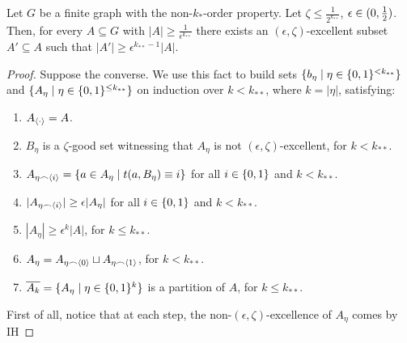         \begin{lemma}[Claim 5.4] \label{lem:existance_of_excellent_subsets}
            Let $G$ be a finite graph with the non-$k_{*}$-order property.
            Let $\zeta \leq \frac{1}{2^{k_{**}}}$, $\epsilon \in ( 0, \frac{1}{2} )$.
            Then, for every $A \subseteq G$ with $|A| \geq \frac{1}{\epsilon^{k_{**}}}$ there exists an $(\epsilon, \zeta)$-excellent
            subset $A' \subseteq A$ such that $|A'| \geq \epsilon^{k_{**}-1} |A|$.
            \begin{proof}
                Suppose the converse.
                We use this fact to build sets $\{ b_\eta \mid \eta \in \{ 0,1 \}^{<k_{**}} \}$ and
                $\{ A_\eta \mid \eta \in \{ 0,1 \}^{\leq k_{**}} \}$ on induction over $k<k_{**}$, where $k = |\eta|$,
                satisfying:
                \begin{enumerate}
                    \item\label{itm:existance_of_excellent_subsets.1} $A_{\left< \cdot \right>} = A$.
                    \item\label{itm:existance_of_excellent_subsets.2} $B_\eta$ is a $\zeta$-good set witnessing that $A_\eta$ is not
                        $(\epsilon, \zeta)$-excellent, for $k < k_{**}$.
                    \item\label{itm:existance_of_excellent_subsets.3} $A_{\eta \frown \left< i \right>} = \{ a \in A_\eta \mid t(a, B_\eta) \equiv i \}$
                        for all $i \in \{ 0,1 \}$ and $k < k_{**}$.
                    \item\label{itm:existance_of_excellent_subsets.4} $| A_{\eta \frown \left< i \right>} | \geq \epsilon |A_\eta|$
                        for all $i \in \{ 0,1 \}$ and $k < k_{**}$.
                    \item\label{itm:existance_of_excellent_subsets.5} $|A_\eta| \geq \epsilon^k |A|$, for $k \leq k_{**}$.
                    \item\label{itm:existance_of_excellent_subsets.6} $A_\eta = A_{\eta \frown \left< 0 \right>} \sqcup A_{\eta \frown \left< 1 \right>}$,
                        for $k < k_{**}$.
                    \item\label{itm:existance_of_excellent_subsets.7} $\overline{A_k} = \{ A_\eta \mid \eta \in \{ 0,1 \}^k \}$ is a partition of $A$,
                        for $k \leq k_{**}$.
                \end{enumerate}
                First of all, notice that at each step, the non-$(\epsilon, \zeta)$-excellence of $A_\eta$ comes by IH

\end{proof}
\end{lemma}
